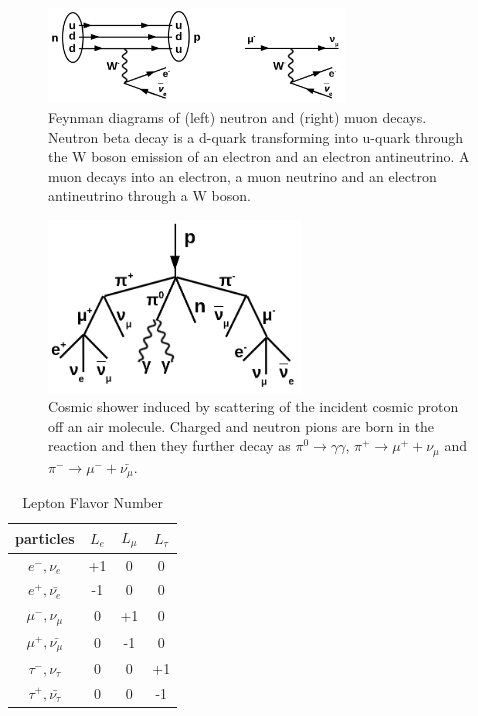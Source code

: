 \begin{figure}
\caption{Feynman diagrams of (left) neutron and (right) muon decays. Neutron beta decay is a d-quark transforming into u-quark through the W boson emission of an electron and an electron antineutrino. A muon decays into an electron, a muon neutrino and an electron antineutrino through a W boson.}
\label{fig:MuonAndNeutronDecays}
\centering
\includegraphics[width=0.70\textwidth, keepaspectratio=true]{figs/NeutronAndMuonDecays.png}
\end{figure}
\begin{figure}
\caption{Cosmic shower induced by scattering of the incident cosmic proton off an air molecule. Charged and neutron pions are born in the reaction and then they further decay as $\pi^0 \rightarrow \gamma\gamma$, $\pi^+ \rightarrow \mu^+ + \nu_\mu$ and $\pi^- \rightarrow \mu^- + \bar{\nu_\mu}$.}
\label{fig:cosmicMuons}
\centering
\includegraphics[width=0.60\textwidth, keepaspectratio=true]{figs/cosmicMuons.png}
\end{figure}
\begin{table}[h]
  \begin{center}
  \caption{ Lepton Flavor Number}
  \begin{tabular}{|c|c|c|c|}
     particles & $L_e$ & $L_{\mu}$ & $L_{\tau}$ \\ \hline
     $e^-,\nu_e$ &  +1  &  0  &  0  \\ \hline 
     $e^+, \bar{\nu_e}$ &  -1  &  0  &  0  \\ \hline 
     $\mu^-,\nu_{\mu}$ &  0  &  +1  &  0  \\ \hline 
     $\mu^+, \bar{\nu_{\mu}}$ &  0  &  -1  &  0  \\ \hline 
     $\tau^-,\nu_{\tau}$ &  0  &  0  &  +1  \\ \hline 
     $\tau^+, \bar{\nu_{\tau}}$ &  0  &  0  &  -1  \\ \hline 
  \end{tabular}
  \label{tab:LeptonFlavorNumber}
  \end{center}
\end{table}
